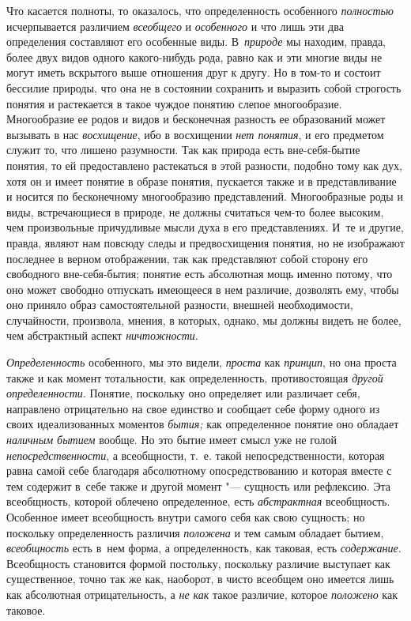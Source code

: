 Что касается полноты, то оказалось, что определенность особенного
{\em полностью} исчерпывается различием {\em всеобщего} и {\em особенного}
и что лишь эти два определения составляют его особенные виды.
В~{\em природе} мы находим,
правда, более двух видов одного какого-нибудь рода, равно как и эти многие
виды не могут иметь вскрытого выше отношения друг к другу. Но в том-то и
состоит бессилие природы, что она не в состоянии сохранить и выразить собой
строгость понятия и растекается в такое чуждое понятию слепое многообразие.
Многообразие ее родов и видов и бесконечная разность ее образований может
вызывать в нас {\em восхищение}, ибо в восхищении {\em нет
понятия}, и его предметом служит то, что лишено разумности.
Так как природа есть вне-себя-бытие понятия, то ей предоставлено
растекаться в этой разности, подобно тому как дух, хотя он и имеет понятие
в образе понятия, пускается также и в представливание и носится по
бесконечному многообразию представлений. Многообразные роды и виды,
встречающиеся в природе, не должны считаться чем-то более высоким, чем
произвольные причудливые мысли духа в его представлениях. И~те и другие,
правда, являют нам повсюду следы и предвосхищения понятия, но не изображают
последнее в верном отображении, так как представляют собой сторону его
свободного вне-себя-бытия; понятие есть абсолютная мощь именно потому, что
оно может свободно отпускать имеющееся в нем различие, дозволять ему, чтобы
оно приняло образ самостоятельной разности, внешней необходимости,
случайности, произвола, мнения, в которых, однако, мы должны видеть не
более, чем абстрактный аспект {\em ничтожности}.

{\em Определенность} особенного, мы это видели, {\em проста} как {\em принцип},
но она проста также и как момент тотальности, как определенность,
противостоящая {\em другой определенности}.
Понятие, поскольку оно определяет или различает себя,
направлено отрицательно на свое единство и сообщает себе форму одного из
своих идеализованных моментов {\em бытия;} как
определенное понятие оно обладает {\em наличным бытием}
вообще. Но это бытие имеет смысл уже не голой {\em непосредственности},
а всеобщности, т.~е. такой непосредственности, которая равна
самой себе благодаря абсолютному опосредствованию и которая вместе с тем
содержит в~себе также и другой момент "--- сущность или
рефлексию. Эта всеобщность, которой облечено определенное, есть
{\em абстрактная} всеобщность. Особенное имеет всеобщность внутри самого себя
как свою сущность; но поскольку определенность различия {\em положена} и тем
самым обладает бытием, {\em всеобщность} есть
в~нем форма, а определенность, как таковая, есть {\em содержание}.
Всеобщность становится формой постольку, поскольку различие
выступает как существенное, точно так же как, наоборот, в чисто всеобщем
оно имеется лишь как абсолютная отрицательность, а {\em не как} такое
различие, которое {\em положено} как таковое.

